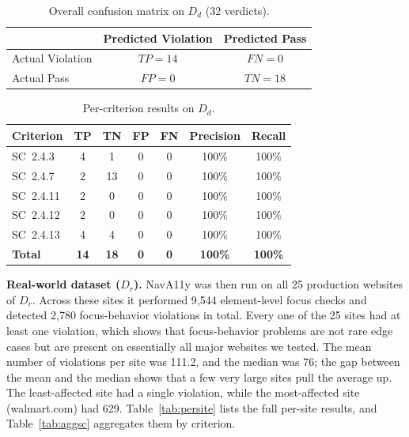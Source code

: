 \begin{table}[ht]
  \centering
  \caption{Overall confusion matrix on $D_d$ (32 verdicts).}
  \label{tab:cm}
  \begin{tabular}{lcc}
    \toprule
     & Predicted Violation & Predicted Pass \\
    \midrule
    Actual Violation & $TP = 14$ & $FN = 0$ \\
    Actual Pass      & $FP = 0$  & $TN = 18$ \\
    \bottomrule
  \end{tabular}
\end{table}

\begin{table}[ht]
  \centering
  \caption{Per-criterion results on $D_d$.}
  \label{tab:persc}
  \begin{tabular}{lcccccc}
    \toprule
    Criterion & TP & TN & FP & FN & Precision & Recall \\
    \midrule
    SC~2.4.3  & 4 & 1  & 0 & 0 & 100\% & 100\% \\
    SC~2.4.7  & 2 & 13 & 0 & 0 & 100\% & 100\% \\
    SC~2.4.11 & 2 & 0  & 0 & 0 & 100\% & 100\% \\
    SC~2.4.12 & 2 & 0  & 0 & 0 & 100\% & 100\% \\
    SC~2.4.13 & 4 & 4  & 0 & 0 & 100\% & 100\% \\
    \midrule
    \textbf{Total} & \textbf{14} & \textbf{18} & \textbf{0} & \textbf{0} & \textbf{100\%} & \textbf{100\%} \\
    \bottomrule
  \end{tabular}
\end{table}

\textbf{Real-world dataset ($D_r$).} NavA11y was then run on all 25 production websites of
$D_r$. Across these sites it performed 9{,}544 element-level focus checks and detected
2{,}780 focus-behavior violations in total. Every one of the 25 sites had at least one
violation, which shows that focus-behavior problems are not rare edge cases but are present
on essentially all major websites we tested. The mean number of violations per site was
111.2, and the median was 76; the gap between the mean and the median shows that a few very
large sites pull the average up. The least-affected site had a single violation, while the
most-affected site (walmart.com) had 629. Table~\ref{tab:persite} lists the full per-site
results, and Table~\ref{tab:aggsc} aggregates them by criterion.

